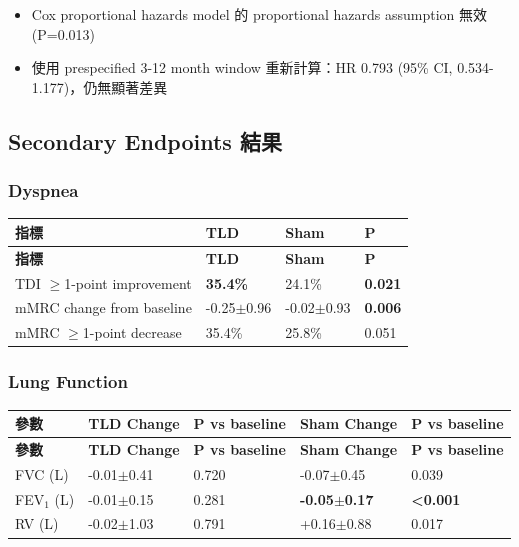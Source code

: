 \documentclass[12pt,a4paper]{article}
\begin{document}
\begin{itemize}
    \item Cox proportional hazards model 的 proportional hazards assumption 無效 (P=0.013)
    \item 使用 prespecified 3-12 month window 重新計算：HR 0.793 (95\% CI, 0.534-1.177)，仍無顯著差異
\end{itemize}

\subsection{Secondary Endpoints 結果}

\subsubsection{Dyspnea}

\begin{longtable}{p{5cm}p{4cm}p{4cm}p{1.5cm}}
\toprule
\textbf{指標} & \textbf{TLD} & \textbf{Sham} & \textbf{P} \\
\midrule
\endfirsthead

\toprule
\textbf{指標} & \textbf{TLD} & \textbf{Sham} & \textbf{P} \\
\midrule
\endhead

\bottomrule
\endfoot

TDI $\geq$1-point improvement & \textbf{35.4\%} & 24.1\% & \textbf{0.021} \\
\midrule
mMRC change from baseline & -0.25$\pm$0.96 & -0.02$\pm$0.93 & \textbf{0.006} \\
\midrule
mMRC $\geq$1-point decrease & 35.4\% & 25.8\% & 0.051 \\
\bottomrule
\end{longtable}

\subsubsection{Lung Function}

\begin{longtable}{p{3cm}p{3cm}p{3cm}p{3cm}p{2cm}}
\toprule
\textbf{參數} & \textbf{TLD Change} & \textbf{P vs baseline} & \textbf{Sham Change} & \textbf{P vs baseline} \\
\midrule
\endfirsthead

\toprule
\textbf{參數} & \textbf{TLD Change} & \textbf{P vs baseline} & \textbf{Sham Change} & \textbf{P vs baseline} \\
\midrule
\endhead

\bottomrule
\endfoot

FVC (L) & -0.01$\pm$0.41 & 0.720 & -0.07$\pm$0.45 & 0.039 \\
\midrule
FEV$_1$ (L) & -0.01$\pm$0.15 & 0.281 & \textbf{-0.05$\pm$0.17} & \textbf{<0.001} \\
\midrule
RV (L) & -0.02$\pm$1.03 & 0.791 & +0.16$\pm$0.88 & 0.017 \\
\bottomrule
\end{longtable}
\end{document}
